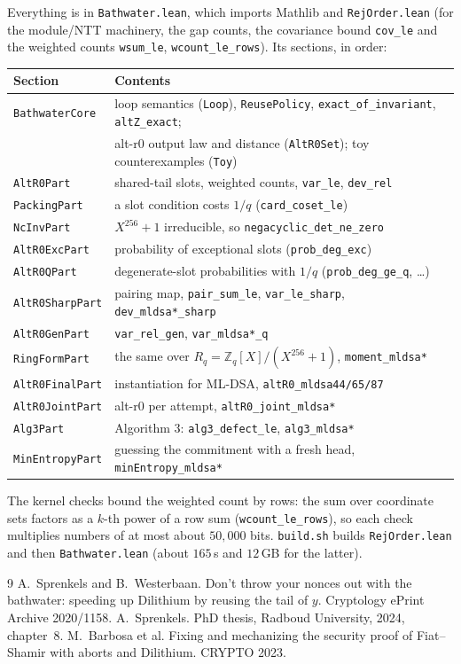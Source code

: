 \documentclass[11pt]{article}
\theoremstyle{definition}
\theoremstyle{remark}
\newcommand{\Z}{\mathbb{Z}}
\newcommand{\lean}[1]{\texttt{#1}}
\begin{document}
Everything is in \lean{Bathwater.lean}, which imports Mathlib and \lean{RejOrder.lean} (for the
module/NTT machinery, the gap counts, the covariance bound \lean{cov\_le} and the weighted counts
\lean{wsum\_le}, \lean{wcount\_le\_rows}). Its sections, in order:
\begin{center}
\begin{tabular}{@{}ll@{}}
\toprule
Section & Contents\\
\midrule
\lean{BathwaterCore} & loop semantics (\lean{Loop}), \lean{ReusePolicy}, \lean{exact\_of\_invariant},
  \lean{altZ\_exact};\\
 & alt-r0 output law and distance (\lean{AltR0Set}); toy counterexamples (\lean{Toy})\\
\lean{AltR0Part} & shared-tail slots, weighted counts, \lean{var\_le}, \lean{dev\_rel}\\
\lean{PackingPart} & a slot condition costs $1/q$ (\lean{card\_coset\_le})\\
\lean{NcInvPart} & $X^{256}+1$ irreducible, so \lean{negacyclic\_det\_ne\_zero}\\
\lean{AltR0ExcPart} & probability of exceptional slots (\lean{prob\_deg\_exc})\\
\lean{AltR0QPart} & degenerate-slot probabilities with $1/q$ (\lean{prob\_deg\_ge\_q}, \dots)\\
\lean{AltR0SharpPart} & pairing map, \lean{pair\_sum\_le},
  \lean{var\_le\_sharp}, \lean{dev\_mldsa*\_sharp}\\
\lean{AltR0GenPart} & \lean{var\_rel\_gen}, \lean{var\_mldsa*\_q}\\
\lean{RingFormPart} & the same over $R_q = \Z_q[X]/(X^{256}+1)$, \lean{moment\_mldsa*}\\
\lean{AltR0FinalPart} & instantiation for ML-DSA, \lean{altR0\_mldsa44/65/87}\\
\lean{AltR0JointPart} & alt-r0 per attempt, \lean{altR0\_joint\_mldsa*}\\
\lean{Alg3Part} & Algorithm 3: \lean{alg3\_defect\_le}, \lean{alg3\_mldsa*}\\
\lean{MinEntropyPart} & guessing the commitment with a fresh head, \lean{minEntropy\_mldsa*}\\
\bottomrule
\end{tabular}
\end{center}
The kernel checks bound the weighted count by rows: the sum over coordinate sets factors as a
$k$-th power of a row sum (\lean{wcount\_le\_rows}), so each check multiplies numbers of at most
about $50{,}000$ bits. \lean{build.sh} builds \lean{RejOrder.lean} and then \lean{Bathwater.lean}
(about $165$\,s and $12$\,GB for the latter).

\begin{thebibliography}{9}
 A.~Sprenkels and B.~Westerbaan. Don't throw your nonces out with the bathwater:
  speeding up Dilithium by reusing the tail of $y$. Cryptology ePrint Archive 2020/1158.
 A.~Sprenkels. PhD thesis, Radboud University, 2024, chapter~8.
 M.~Barbosa et al. Fixing and mechanizing the security proof of
  Fiat--Shamir with aborts and Dilithium. CRYPTO 2023.
\end{thebibliography}
\end{document}
